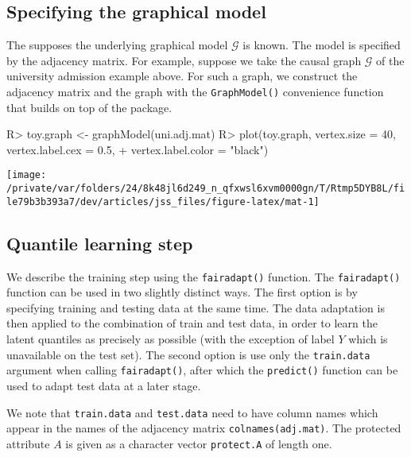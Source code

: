 \documentclass[
  notitle]{jss}
\begin{document}
\hypertarget{specifying-the-graphical-model}{%
\subsection{Specifying the graphical
model}\label{specifying-the-graphical-model}}

The  supposes the underlying graphical model
\(\mathcal{G}\) is known. The model is specified by the adjacency
matrix. For example, suppose we take the causal graph \(\mathcal{G}\) of
the university admission example above. For such a graph, we construct
the adjacency matrix and the graph with the \texttt{GraphModel()}
convenience function that builds on top of the  package.

\begin{CodeChunk}
\begin{CodeInput}
R> toy.graph <- graphModel(uni.adj.mat)
R> plot(toy.graph, vertex.size = 40, vertex.label.cex = 0.5,
+   vertex.label.color = "black")
\end{CodeInput}


\begin{center}\texttt{[image: /private/var/folders/24/8k48jl6d249\_n\_qfxwsl6xvm0000gn/T/Rtmp5DYB8L/file79b3b393a7/dev/articles/jss\_files/figure-latex/mat-1]} \end{center}

\end{CodeChunk}

\hypertarget{quantile-learning-step}{%
\subsection{Quantile learning step}\label{quantile-learning-step}}

We describe the training step using the \texttt{fairadapt()} function.
The \texttt{fairadapt()} function can be used in two slightly distinct
ways. The first option is by specifying training and testing data at the
same time. The data adaptation is then applied to the combination of
train and test data, in order to learn the latent quantiles as precisely
as possible (with the exception of label \(Y\) which is unavailable on
the test set). The second option is use only the \texttt{train.data}
argument when calling \texttt{fairadapt()}, after which the
\texttt{predict()} function can be used to adapt test data at a later
stage.

We note that \texttt{train.data} and \texttt{test.data} need to have
column names which appear in the names of the adjacency matrix
\texttt{colnames(adj.mat)}. The protected attribute \(A\) is given as a
character vector \texttt{protect.A} of length one.
\end{document}
